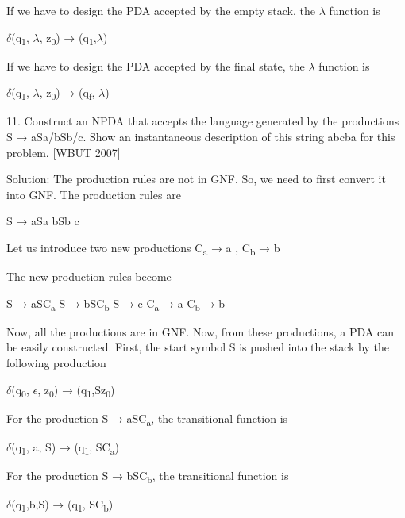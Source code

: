 \documentclass[]{article}
\begin{document}
If we have to design the PDA accepted by the empty stack, the  $\lambda$ function is

\begin{center}
$\delta$(q\textsubscript{1}, $\lambda$, z\textsubscript{0}) → (q\textsubscript{1},$\lambda$)
\end{center}

If we have to design the PDA accepted by the final state, the $\lambda$ function is

\begin{center}
$\delta$(q\textsubscript{1}, $\lambda$, z\textsubscript{0}) → (q\textsubscript{f}, $\lambda$)
\end{center}

11. Construct an NPDA that accepts the language generated by the productions S → aSa/bSb/c. Show an instantaneous description of this string abcba for this problem. [WBUT 2007]


Solution: The production rules are not in GNF. So, we need to first convert it into GNF. The production rules are

\begin{center}
S → aSa \textbar{} bSb \textbar{} c
\end{center}

\begin{center}
Let us introduce two new productions  C\textsubscript{a} → a , C\textsubscript{b} → b
\end{center}
The new production rules become
\begin{center}
S → aSC\textsubscript{a}
S → bSC\textsubscript{b}
S → c
C\textsubscript{a} → a
C\textsubscript{b} → b
\end{center}
Now, all the productions are in GNF.
Now, from these productions, a PDA can be easily constructed.
First, the start symbol S is pushed into the stack by the following production

\begin{center}
$\delta$(q\textsubscript{0}, $\epsilon$, z\textsubscript{0}) → (q\textsubscript{1},Sz\textsubscript{0})
\end{center}

For the production S → aSC\textsubscript{a}, the transitional function is


\begin{center}
$\delta$(q\textsubscript{1}, a, S) → (q\textsubscript{1}, SC\textsubscript{a})
\end{center}

For the production S → bSC\textsubscript{b}, the transitional function is
\begin{center}
$\delta$(q\textsubscript{1},b,S) → (q\textsubscript{1}, SC\textsubscript{b})
\end{center}
\end{document}
